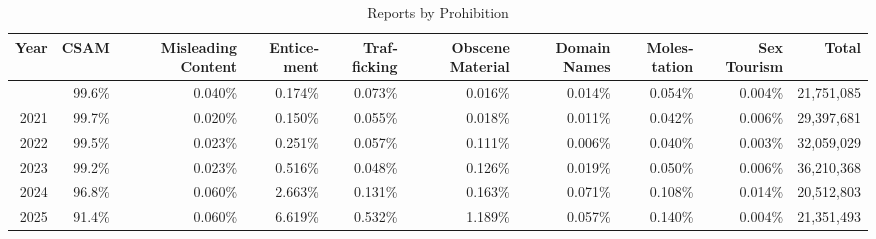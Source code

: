\begin{table}[!t]
\caption*{
{\large Reports by Prohibition}
} 

\fontsize{12.0pt}{14.4pt}\selectfont

\begin{tabular*}{\linewidth}{@{\extracolsep{\fill}}rrrrrrrrrr}
\toprule
Year & CSAM & Misleading Content & Entice­ment & Traf­ficking & Obscene Material & Domain Names & Moles­tation & Sex Tourism & Total \\ 
\midrule\addlinespace[2.5pt]
2020 & 99.6\% & 0.040\% & 0.174\% & 0.073\% & 0.016\% & 0.014\% & 0.054\% & 0.004\% & 21,751,085 \\
2021 & 99.7\% & 0.020\% & 0.150\% & 0.055\% & 0.018\% & 0.011\% & 0.042\% & 0.006\% & 29,397,681 \\
2022 & 99.5\% & 0.023\% & 0.251\% & 0.057\% & 0.111\% & 0.006\% & 0.040\% & 0.003\% & 32,059,029 \\
2023 & 99.2\% & 0.023\% & 0.516\% & 0.048\% & 0.126\% & 0.019\% & 0.050\% & 0.006\% & 36,210,368 \\
2024 & 96.8\% & 0.060\% & 2.663\% & 0.131\% & 0.163\% & 0.071\% & 0.108\% & 0.014\% & 20,512,803 \\
2025 & 91.4\% & 0.060\% & 6.619\% & 0.532\% & 1.189\% & 0.057\% & 0.140\% & 0.004\% & 21,351,493 \\
\bottomrule
\end{tabular*}

\end{table}
